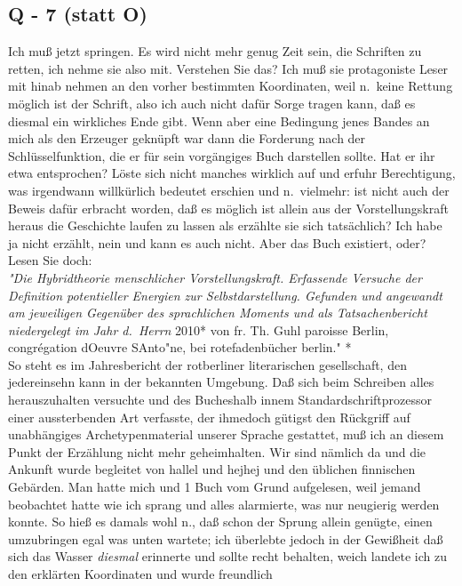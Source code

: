\documentclass[
]{article}
\author{}
\date{\vspace{-2.5em}}
\begin{document}
\subsection{Q - 7 (statt O)}\label{q---7-statt-o}

Ich muß jetzt springen. Es wird nicht mehr genug Zeit sein, die
Schriften zu retten, ich nehme sie also mit. Verstehen Sie das? Ich muß
sie protagoniste Leser mit hinab nehmen an den vorher bestimmten
Koordinaten, weil n.~keine Rettung möglich ist der Schrift, also ich
auch nicht dafür Sorge tragen kann, daß es diesmal ein wirkliches Ende
gibt. Wenn aber eine Bedingung jenes Bandes an mich als den Erzeuger
geknüpft war dann die Forderung nach der Schlüsselfunktion, die er für
sein vorgängiges Buch darstellen sollte. Hat er ihr etwa entsprochen?
Löste sich nicht manches wirklich auf und erfuhr Berechtigung, was
irgendwann willkürlich bedeutet erschien und n.~vielmehr: ist nicht auch
der Beweis dafür erbracht worden, daß es möglich ist allein aus der
Vorstellungskraft heraus die Geschichte laufen zu lassen als erzählte
sie sich tatsächlich? Ich habe ja nicht erzählt, nein und kann es auch
nicht. Aber das Buch existiert, oder? Lesen Sie doch:\\
\emph{"Die Hybridtheorie menschlicher Vorstellungskraft. Erfassende
Versuche der Definition potentieller Energien zur Selbstdarstellung.
Gefunden und angewandt am jeweiligen Gegenüber des sprachlichen Moments
und als Tatsachenbericht niedergelegt im Jahr d.~Herrn }2010* von fr.
Th. Guhl paroisse Berlin, congrégation d\textquotesingle Oeuvre
S\textquotesingle Anto"ne, bei rotefadenbücher berlin." *\\
So steht es im Jahresbericht der rotberliner literarischen gesellschaft,
den jedereinsehn kann in der bekannten Umgebung. Daß sich beim Schreiben
alles herauszuhalten versuchte und des Bucheshalb innem
Standardschriftprozessor einer aussterbenden Art verfasste, der ihmedoch
gütigst den Rückgriff auf unabhängiges Archetypenmaterial unserer
Sprache gestattet, muß ich an diesem Punkt der Erzählung nicht mehr
geheimhalten. Wir sind nämlich da und die Ankunft wurde begleitet von
hallel und hejhej und den üblichen finnischen Gebärden. Man hatte mich
und 1 Buch vom Grund aufgelesen, weil jemand beobachtet hatte wie ich
sprang und alles alarmierte, was nur neugierig werden konnte. So hieß es
damals wohl n., daß schon der Sprung allein genügte, einen umzubringen
egal was unten wartete; ich überlebte jedoch in der Gewißheit daß sich
das Wasser \emph{diesmal} erinnerte und sollte recht behalten, weich
landete ich zu den erklärten Koordinaten und wurde freundlich
\end{document}
